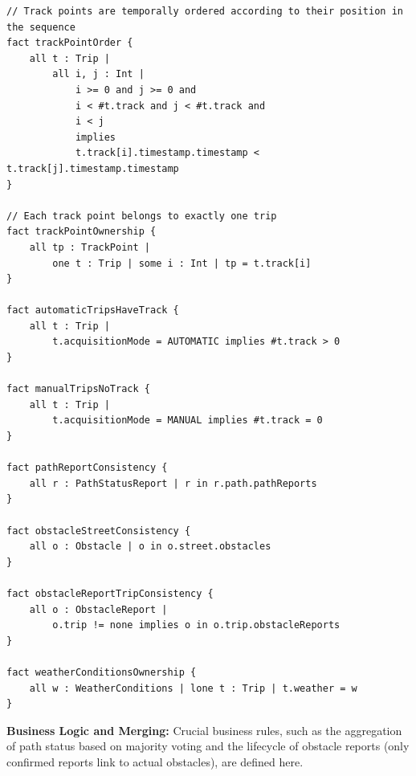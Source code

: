 \begin{lstlisting}[language=Alloy]
// Track points are temporally ordered according to their position in the sequence
fact trackPointOrder {
    all t : Trip |
        all i, j : Int |
            i >= 0 and j >= 0 and
            i < #t.track and j < #t.track and
            i < j
            implies
            t.track[i].timestamp.timestamp < t.track[j].timestamp.timestamp
}

// Each track point belongs to exactly one trip
fact trackPointOwnership {
    all tp : TrackPoint |
        one t : Trip | some i : Int | tp = t.track[i]
}

fact automaticTripsHaveTrack {
    all t : Trip |
        t.acquisitionMode = AUTOMATIC implies #t.track > 0
}

fact manualTripsNoTrack {
    all t : Trip |
        t.acquisitionMode = MANUAL implies #t.track = 0
}

fact pathReportConsistency {
    all r : PathStatusReport | r in r.path.pathReports
}

fact obstacleStreetConsistency {
    all o : Obstacle | o in o.street.obstacles
}

fact obstacleReportTripConsistency {
    all o : ObstacleReport |
        o.trip != none implies o in o.trip.obstacleReports
}

fact weatherConditionsOwnership {
    all w : WeatherConditions | lone t : Trip | t.weather = w
}
\end{lstlisting}

\par
\textbf{Business Logic and Merging:}
Crucial business rules, such as the aggregation of path status based on majority voting and the lifecycle of obstacle reports (only confirmed reports link to actual obstacles), are defined here.

